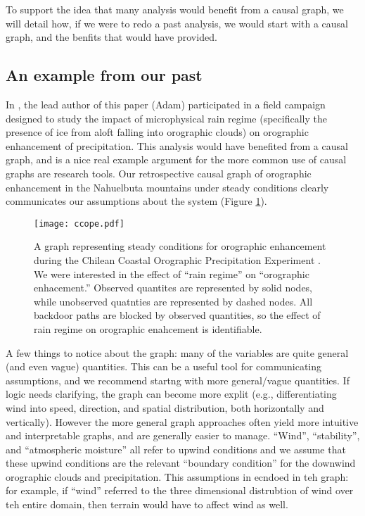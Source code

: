 \documentclass[12pt]{article}
\begin{document}
To support the idea that many analysis would benefit from a causal
graph, we will detail how, if we were to redo a past analysis, we
would start with a causal graph, and the benfits that would have
provided.

\subsection{An example from our past}

In \citet{massmann2017}, the lead author of this paper (Adam)
participated in a field campaign designed to study the impact of
microphysical rain regime (specifically the presence of ice from aloft
falling into orographic clouds) on orographic enhancement of
precipitation. This analysis would have benefited from a causal graph,
and is a nice real example argument for the more common use of causal
graphs are research tools. Our retrospective causal graph of
orographic enhancement in the Nahuelbuta mountains under steady
conditions clearly communicates our assumptions about the system
(Figure \ref{fig:ccope}).

\begin{figure}
  \texttt{[image: ccope.pdf]}
  \caption{A graph representing steady conditions for orographic
    enhancement during the Chilean Coastal Orographic Precipitation
    Experiment \citep[CCOPE,][]{massmann2017}. We were interested in
    the effect of ``rain regime'' on ``orographic enhacement.''
    Observed quantites are represented by solid nodes, while
    unobserved quatnties are represented by dashed nodes. All backdoor
    paths are blocked by observed quantities, so the effect of rain
    regime on orographic enahcement is identifiable.}
  \label{fig:ccope}
\end{figure}

A few things to notice about the graph: many of the variables are
quite general (and even vague) quantities. This can be a useful tool
for communicating assumptions, and we recommend startng with more
general/vague quantities. If logic needs clarifying, the graph can
become more explit (e.g., differentiating wind into speed, direction,
and spatial distribution, both horizontally and vertically). However
the more general graph approaches often yield more intuitive and
interpretable graphs, and are generally easier to manage. ``Wind'',
``stability'', and ``atmospheric moisture'' all refer to upwind
conditions and we assume that these upwind conditions are the relevant
``boundary condition'' for the downwind orographic clouds and
precipitation. This assumptions in ecndoed in teh graph: for example,
if ``wind'' referred to the three dimensional distrubtion of wind over
teh entire domain, then terrain would have to affect wind as well.
\end{document}

